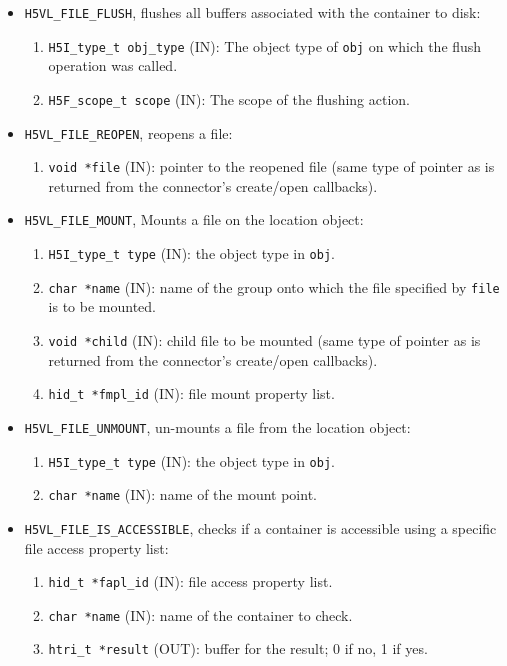 \begin{mdframed}[style=bgbox]
\begin{itemize}
\item \texttt{H5VL\_FILE\_FLUSH}, flushes all buffers associated with the container to disk:
  \begin{enumerate}
  \item \texttt{H5I\_type\_t obj\_type} (IN): The object type of \texttt{obj} on which the flush operation was called.
  \item \texttt{H5F\_scope\_t scope} (IN): The scope of the flushing action.
  \end{enumerate}
  
\item \texttt{H5VL\_FILE\_REOPEN}, reopens a file:
  \begin{enumerate}
      \item \texttt{void *file} (IN): pointer to the reopened file (same type
          of pointer as is returned from the connector's create/open callbacks).
  \end{enumerate}
  
\item \texttt{H5VL\_FILE\_MOUNT}, Mounts a file on the location object:
  \begin{enumerate}
  \item \texttt{H5I\_type\_t type} (IN): the object type in \texttt{obj}.
  \item \texttt{char *name} (IN): name of the group onto which the file
    specified by \texttt{file} is to be mounted.
  \item \texttt{void *child} (IN): child file to be mounted (same type
          of pointer as is returned from the connector's create/open callbacks).
  \item \texttt{hid\_t *fmpl\_id} (IN): file mount property list.
  \end{enumerate}

\item \texttt{H5VL\_FILE\_UNMOUNT}, un-mounts a file from the location object:
  \begin{enumerate}
  \item \texttt{H5I\_type\_t type} (IN): the object type in \texttt{obj}.
  \item \texttt{char *name} (IN): name of the mount point.
  \end{enumerate}

\item \texttt{H5VL\_FILE\_IS\_ACCESSIBLE}, checks if a container is
  accessible using a specific file access property list:
  \begin{enumerate}
  \item \texttt{hid\_t *fapl\_id} (IN): file access property list.
  \item \texttt{char *name} (IN): name of the container to check.
  \item \texttt{htri\_t *result} (OUT): buffer for the result; 0 if no, 1
    if yes.
  \end{enumerate}


\end{itemize}
\end{mdframed}
